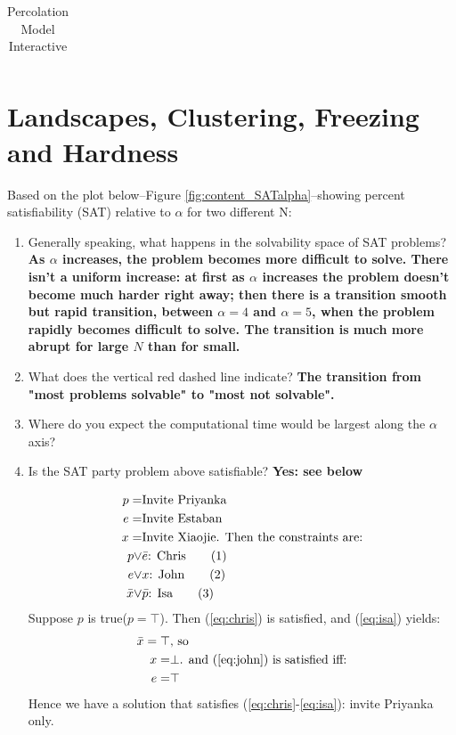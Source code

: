 \documentclass[]{article}
\newcommand\numberthis{\addtocounter{equation}{1}\tag{\theequation}}
\begin{document}
\begin{table}[H]
	\begin{center}
		\caption{Percolation Model Interactive}\label{eq:percolation}
		\begin{tabular}{|c|c|}\hline
			&\\ \hline
		\end{tabular}
	\end{center}
\end{table}

\section{Landscapes, Clustering, Freezing and Hardness}

Based on the plot below--Figure \ref{fig:content_SATalpha}--showing percent satisfiability (SAT) relative to $\alpha$ for two different N:

\begin{enumerate}
	\item  Generally speaking, what happens in the solvability space of SAT problems? \textbf{As  $\alpha$ increases, the problem becomes more difficult to solve. There isn't a uniform increase: at first as  $\alpha$ increases the problem doesn't become much harder right away; then there is a transition smooth but rapid transition, between  $\alpha=4$ and  $\alpha=5$, when the problem rapidly becomes difficult to solve.  The transition is much more abrupt for large $N$ than for small.}

	\item  What does the vertical red dashed line indicate? \textbf{The transition from "most problems solvable" to "most not solvable".}

	\item   Where do you expect the computational time would be largest along the $\alpha$ axis?

	\item   Is the SAT party problem above satisfiable? \textbf{Yes: see below}
	
	\begin{align*}
		p =& \text{Invite Priyanka}\\
		e =& \text {Invite Estaban}\\
		x =& \text{Invite Xiaojie. Then the constraints are:}\\
		p \lor& \bar{e} \text{: Chris} \numberthis \label{eq:chris}\\
		e \lor& x \text{: John} \numberthis \label{eq:john}\\
		\bar{x} \lor& \bar{p} \text{: Isa} \numberthis \label{eq:isa}
	\end{align*}
	Suppose $p$ is true($p=\top$). Then (\ref{eq:chris}) is satisfied, and (\ref{eq:isa}) yields:
	\begin{align*}
		\bar{x}=\top& \text{, so}\\
		x =& \bot \text{. and (\ref{eq:john}) is satisfied iff:}\\
		e =& \top 
	\end{align*}
	Hence we have a solution that satisfies (\ref{eq:chris}-\ref{eq:isa}): invite Priyanka only.
\end{enumerate}
\end{document}

